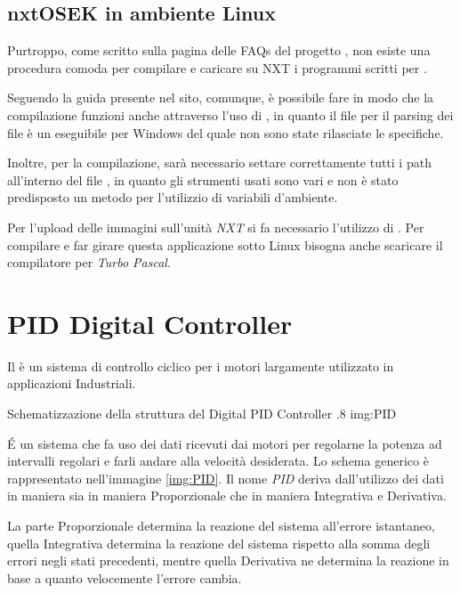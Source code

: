 \subsection{nxtOSEK in ambiente Linux} \label{sec:nxtoseklinux}
Purtroppo, come scritto sulla pagina delle FAQs del progetto
\nxtOSEK{}\cite{bib:nxtOSEKFAQs}, non esiste una procedura comoda per
compilare e caricare su NXT i programmi scritti per \nxtOSEK{}.

Seguendo la guida presente nel sito\cite{bib:linuxinst}, comunque, è
possibile fare in modo che la compilazione funzioni anche attraverso l'uso
di , in quanto il file per il parsing dei file
 è un eseguibile per Windows del quale non sono state
rilasciate le specifiche.

Inoltre, per la compilazione, sarà necessario settare correttamente tutti i
path all'interno del file , in quanto gli strumenti
usati sono vari e non è stato predisposto un metodo per l'utilizzio di
variabili d'ambiente.

Per l'upload delle immagini sull'unità \emph{NXT} si fa necessario
l'utilizzo di . Per compilare e far girare questa
applicazione sotto Linux bisogna anche scaricare il compilatore per
\emph{Turbo Pascal}.

\section{PID Digital Controller}
Il \PID{} è un sistema di controllo ciclico per i motori largamente
utilizzato in applicazioni Industriali.

        {Schematizzazione della struttura del Digital PID Controller}
        {.8}
        {img:PID}

\'E un sistema che fa uso dei dati ricevuti dai motori per regolarne la
potenza ad intervalli regolari e farli andare alla velocità desiderata. Lo
schema generico è rappresentato nell'immagine \ref{img:PID}. Il nome
\emph{PID} deriva dall'utilizzo dei dati in maniera sia in maniera
Proporzionale che in maniera Integrativa e Derivativa.

La parte Proporzionale determina la reazione del sistema all'errore
istantaneo, quella Integrativa determina la reazione del sistema rispetto
alla somma degli errori negli stati precedenti, mentre quella Derivativa
ne determina la reazione in base a quanto velocemente l'errore cambia.

